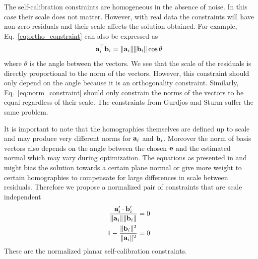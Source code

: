 \documentclass[10pt,twocolumn,letterpaper]{article}
\begin{document}
The self-calibration constraints are homogeneous in the absence of noise. In this case their scale does not matter. However, with real data the constraints will have non-zero residuals and their scale affects the solution obtained. For example, Eq.~\eqref{eq:ortho_constraint} can also be expressed as
\begin{align}
\mathbf{a}_i^\top \mathbf{b}_i = \lVert\mathbf{a}_i\rVert \lVert\mathbf{b}_i\rVert \cos \theta
\end{align} 
where $\theta$ is the angle between the vectors. We see that the scale of the residuals is directly proportional to the norm of the vectors. However, this constraint should only depend on the angle because it is an orthogonality constraint. Similarly, Eq.~\eqref{eq:norm_constraint} should only constrain the norms of the vectors to be equal regardless of their scale. The constraints from Gurdjos and Sturm \cite{gurdjos2003} suffer the same problem.

It is important to note that the homographies themselves are defined up to scale and may produce very different norms for $\mathbf{a}_i$ and $\mathbf{b}_i$. Moreover the norm of basis vectors also depends on the angle between the chosen $\mathbf{e}$ and the estimated normal which may vary during optimization. The equations as presented in \cite{bocquillon2006} and \cite{gurdjos2003} might bias the solution towards a certain plane normal or give more weight to certain homographies to compensate for large differences in scale between residuals. Therefore we propose a normalized pair of constraints that are scale independent 
\begin{align}
\frac{\mathbf{a}_i' \cdot \mathbf{b}_i'}{\lVert\mathbf{a}_i\rVert \lVert\mathbf{b}_i\rVert} = 0 \label{eq:ortho_constraint_normalized}\\
1 - \frac{\lVert\mathbf{b}_i\rVert^2}{\lVert\mathbf{a}_i\rVert^2} = 0 \label{eq:norm_constraint_normalized}
\end{align}
These are the normalized planar self-calibration constraints.

%
\end{document}
